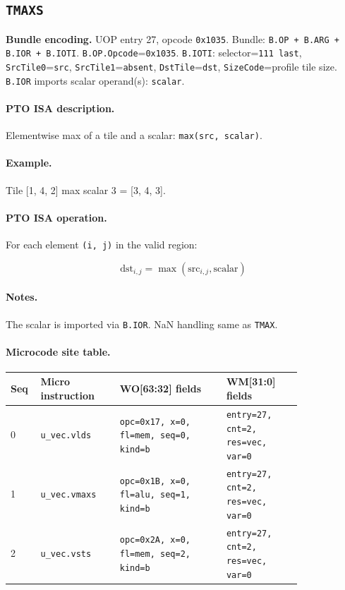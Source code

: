 \subsection{\texttt{TMAXS}}
\noindent\textbf{Bundle encoding.} UOP entry 27, opcode \texttt{0x1035}. Bundle: \texttt{B.OP + B.ARG + B.IOR + B.IOTI}. \texttt{B.OP.Opcode}=\texttt{0x1035}. \texttt{B.IOTI}: selector=\texttt{111 last}, \texttt{SrcTile0}=\texttt{src}, \texttt{SrcTile1}=\texttt{absent}, \texttt{DstTile}=\texttt{dst}, \texttt{SizeCode}=profile tile size. \texttt{B.IOR} imports scalar operand(s): \texttt{scalar}.\par\smallskip
{\small
\paragraph{PTO ISA description.}
Elementwise max of a tile and a scalar: \texttt{max(src, scalar)}.
\paragraph{Example.}
Tile [1, 4, 2] max scalar 3 = [3, 4, 3].
\par\smallskip
\paragraph{PTO ISA operation.}
For each element \texttt{(i, j)} in the valid region:

\[
\mathrm{dst}_{i,j} = \max(\mathrm{src}_{i,j}, \mathrm{scalar})
\]
}\par\smallskip
\paragraph{Notes.}
The scalar is imported via \texttt{B.IOR}. NaN handling same as \texttt{TMAX}.
\paragraph{Microcode site table.}
{\scriptsize
\begin{longtable}{@{}R{0.055\linewidth}L{0.23\linewidth}L{0.31\linewidth}L{0.22\linewidth}@{}}
\toprule
Seq & Micro instruction & WO[63:32] fields & WM[31:0] fields \\
 & \texttt{u\_vec.vlds} & \texttt{opc=0x17, x=0, fl=mem, seq=0, kind=b} & \texttt{entry=27, cnt=2, res=vec, var=0} \\
1 & \texttt{u\_vec.vmaxs} & \texttt{opc=0x1B, x=0, fl=alu, seq=1, kind=b} & \texttt{entry=27, cnt=2, res=vec, var=0} \\
2 & \texttt{u\_vec.vsts} & \texttt{opc=0x2A, x=0, fl=mem, seq=2, kind=b} & \texttt{entry=27, cnt=2, res=vec, var=0} \\
\bottomrule
\end{longtable}
}
